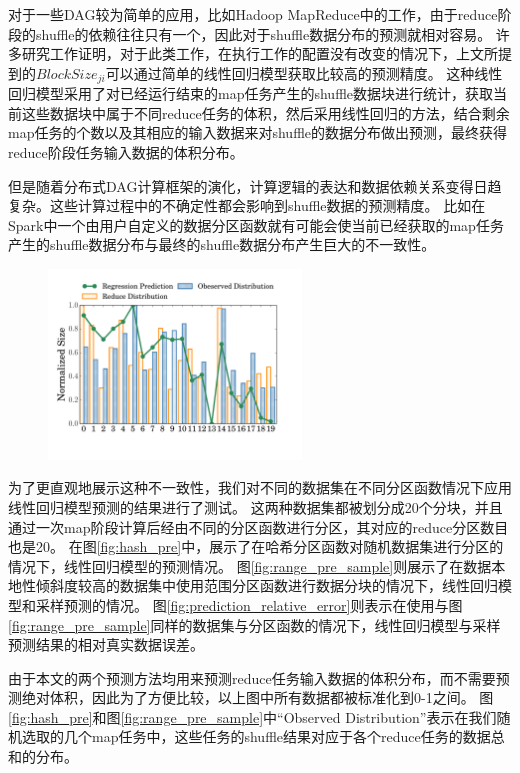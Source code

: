 对于一些DAG较为简单的应用，比如Hadoop MapReduce中的工作\cite{hadoop}，由于reduce阶段的shuffle的依赖往往只有一个，因此对于shuffle数据分布的预测就相对容易。
许多研究工作证明，对于此类工作，在执行工作的配置没有改变的情况下，上文所提到的$BlockSize_{ji}$可以通过简单的线性回归模型获取比较高的预测精度\cite{ishuffle, predict}。
这种线性回归模型采用了对已经运行结束的map任务产生的shuffle数据块进行统计，获取当前这些数据块中属于不同reduce任务的体积，然后采用线性回归的方法，结合剩余map任务的个数以及其相应的输入数据来对shuffle的数据分布做出预测，最终获得reduce阶段任务输入数据的体积分布。

但是随着分布式DAG计算框架的演化，计算逻辑的表达和数据依赖关系变得日趋复杂。这些计算过程中的不确定性都会影响到shuffle数据的预测精度。
比如在Spark中一个由用户自定义的数据分区函数就有可能会使当前已经获取的map任务产生的shuffle数据分布与最终的shuffle数据分布产生巨大的不一致性。
\begin{figure}[!htp]
    \centering
    \includegraphics[width=0.6\textwidth]{../../PPoPP-2018/fig/hash_pre.pdf}
\end{figure}

为了更直观地展示这种不一致性，我们对不同的数据集在不同分区函数情况下应用线性回归模型预测的结果进行了测试。
这两种数据集都被划分成20个分块，并且通过一次map阶段计算后经由不同的分区函数进行分区，其对应的reduce分区数目也是20。
在图\ref{fig:hash_pre}中，展示了在哈希分区函数对随机数据集进行分区的情况下，线性回归模型的预测情况。
图\ref{fig:range_pre_sample}则展示了在数据本地性倾斜度较高的数据集中使用范围分区函数进行数据分块的情况下，线性回归模型和采样预测的情况。
图\ref{fig:prediction_relative_error}则表示在使用与图\ref{fig:range_pre_sample}同样的数据集与分区函数的情况下，线性回归模型与采样预测结果的相对真实数据误差。

由于本文的两个预测方法均用来预测reduce任务输入数据的体积分布，而不需要预测绝对体积，因此为了方便比较，以上图中所有数据都被标准化到0-1之间。
图\ref{fig:hash_pre}和图\ref{fig:range_pre_sample}中“Observed Distribution”表示在我们随机选取的几个map任务中，这些任务的shuffle结果对应于各个reduce任务的数据总和的分布。

